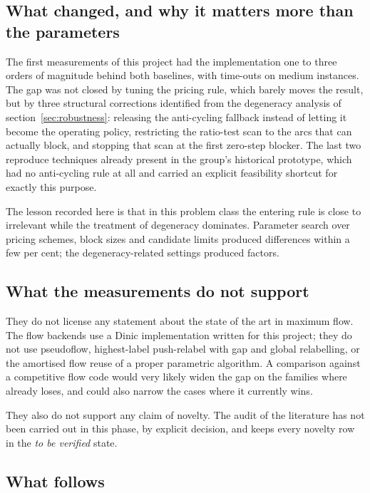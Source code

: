 \subsection{What changed, and why it matters more than the parameters}

The first measurements of this project had the \FS{} implementation one to three
orders of magnitude behind both baselines, with time-outs on medium instances.
The gap was not closed by tuning the pricing rule, which barely moves the
result, but by three structural corrections identified from the degeneracy
analysis of section~\ref{sec:robustness}: releasing the anti-cycling fallback
instead of letting it become the operating policy, restricting the ratio-test
scan to the arcs that can actually block, and stopping that scan at the first
zero-step blocker. The last two reproduce techniques already present in the
group's historical prototype, which had no anti-cycling rule at all and carried
an explicit feasibility shortcut for exactly this purpose.

The lesson recorded here is that in this problem class the entering rule is
close to irrelevant while the treatment of degeneracy dominates. Parameter
search over pricing schemes, block sizes and candidate limits produced
differences within a few per cent; the degeneracy-related settings produced
factors.

\subsection{What the measurements do not support}

They do not license any statement about the state of the art in maximum flow.
The flow backends use a Dinic implementation written for this project; they do
not use pseudoflow, highest-label push-relabel with gap and global relabelling,
or the amortised flow reuse of a proper parametric algorithm. A comparison
against a competitive flow code would very likely widen the gap on the families
where \FS{} already loses, and could also narrow the cases where it currently
wins.

They also do not support any claim of novelty. The audit of the literature has
not been carried out in this phase, by explicit decision, and
 keeps every novelty row in the \emph{to be verified}
state.

\subsection{What follows}

